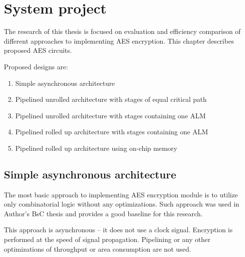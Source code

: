 \section{System project}
\label{sec:system-project}
The research of this thesis is focused on evaluation and efficiency comparison of different approaches to implementing AES encryption. This chapter describes proposed AES circuits.

Proposed designs are:
\begin{enumerate}[noitemsep]
\item Simple asynchronous architecture
\item Pipelined unrolled architecture with stages of equal critical path
\item Pipelined unrolled architecture with stages containing one ALM
\item Pipelined rolled up architecture with stages containing one ALM
\item Pipelined rolled up architecture using on-chip memory
\end{enumerate}

\subsection{Simple asynchronous architecture}
The most basic approach to implementing AES encryption module is to utilize only combinatorial logic without any optimizations. Such approach was used in Author's BsC thesis \cite{inzynierka} and provides a good baseline for this research.

This approach is asynchronous -- it does not use a clock signal. Encryption is performed at the speed of signal propagation. Pipelining or any other optimizations of throughput or area consumption are not used.




